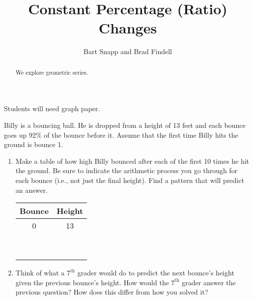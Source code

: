 \documentclass[nooutcomes]{ximera}
\title{Constant Percentage (Ratio) Changes}
\author{Bart Snapp and Brad Findell}
\begin{document}
\begin{abstract}
  We explore geometric series.
\end{abstract}
\maketitle

\label{A:ConstantRatio}
\begin{teachingnote}
Students will need graph paper.
\end{teachingnote}

\begin{problem}
Billy is a bouncing ball.  He is dropped from a height of 13 feet and each bounce goes up 92\% of the bounce before it.  Assume that the first time Billy hits the ground is bounce 1.  

\begin{enumerate}
\item Make a table of how high Billy bounced after each of the first 10 times he hit the ground.  Be sure to indicate the arithmetic process you go through for each bounce (i.e., not just the final height).  Find a pattern that will predict an answer.  

{\renewcommand{\arraystretch}{1.4}
\begin{tabular}{c|c}
        Bounce    & Height \\
\hline
         0       &          13        \\
                 &                      \\
                 &                      \\
                 &                      \\
                 &                      \\
                 &                      \\
                 &                      \\
                 &                      \\
                 &                      \\
                 &                      \\
\end{tabular}
}

\item Think of what a $7^\mathrm{th}$ grader would do to predict the next bounce's height given the previous bounce's height.  How would the $7^\mathrm{th}$ grader answer the previous question?  How does this differ from how you solved it?


\end{enumerate}
\end{problem}
\end{document}
